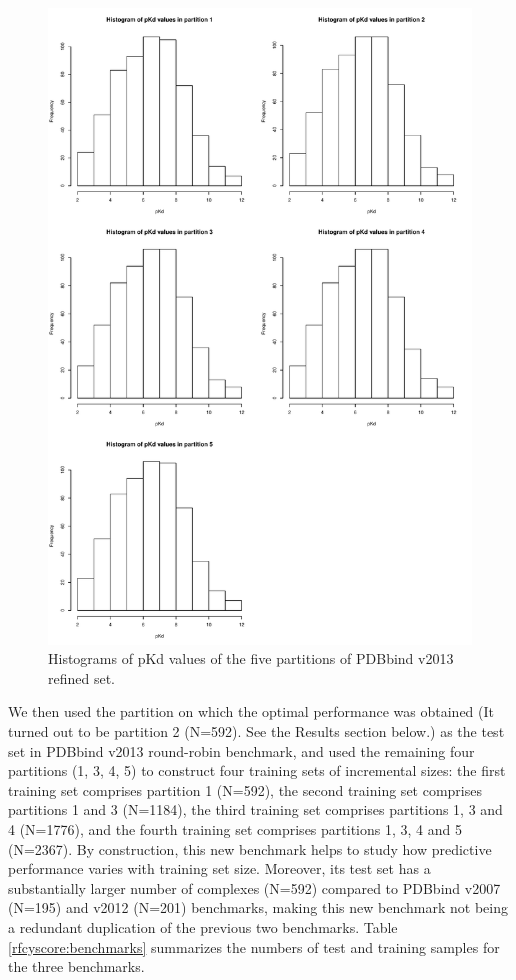 \begin{figure}
\includegraphics[width=\linewidth]{../rfcyscore/cv.pdf}
\caption{Histograms of pKd values of the five partitions of PDBbind v2013 refined set.}
\label{rfcyscore:cv}
\end{figure}

We then used the partition on which the optimal performance was obtained (It turned out to be partition 2 (N=592). See the Results section below.) as the test set in PDBbind v2013 round-robin benchmark, and used the remaining four partitions (1, 3, 4, 5) to construct four training sets of incremental sizes: the first training set comprises partition 1 (N=592), the second training set comprises partitions 1 and 3 (N=1184), the third training set comprises partitions 1, 3 and 4 (N=1776), and the fourth training set comprises partitions 1, 3, 4 and 5 (N=2367). By construction, this new benchmark helps to study how predictive performance varies with training set size. Moreover, its test set has a substantially larger number of complexes (N=592) compared to PDBbind v2007 (N=195) and v2012 (N=201) benchmarks, making this new benchmark not being a redundant duplication of the previous two benchmarks. Table \ref{rfcyscore:benchmarks} summarizes the numbers of test and training samples for the three benchmarks.

